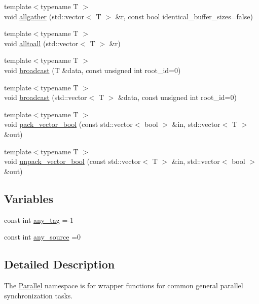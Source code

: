 \begin{DoxyCompactItemize}
\item 
{\footnotesize template$<$typename T $>$ }\\void \mbox{\hyperlink{namespacefemus_1_1_parallel_ae02d87f55017470f374c953e38eaea75}{allgather}} (std\+::vector$<$ T $>$ \&r, const bool identical\+\_\+buffer\+\_\+sizes=false)
\item 
{\footnotesize template$<$typename T $>$ }\\void \mbox{\hyperlink{namespacefemus_1_1_parallel_a879e4a9c2caf698f29d8da1403fece9f}{alltoall}} (std\+::vector$<$ T $>$ \&r)
\item 
{\footnotesize template$<$typename T $>$ }\\void \mbox{\hyperlink{namespacefemus_1_1_parallel_a82b297173b4771c824770ec9acac9689}{broadcast}} (T \&data, const unsigned int root\+\_\+id=0)
\item 
{\footnotesize template$<$typename T $>$ }\\void \mbox{\hyperlink{namespacefemus_1_1_parallel_affafe8ca45b17134d6ee8bbb632aba6b}{broadcast}} (std\+::vector$<$ T $>$ \&data, const unsigned int root\+\_\+id=0)
\item 
{\footnotesize template$<$typename T $>$ }\\void \mbox{\hyperlink{namespacefemus_1_1_parallel_aeda20f4be32ce099559f7e48615b212a}{pack\+\_\+vector\+\_\+bool}} (const std\+::vector$<$ bool $>$ \&in, std\+::vector$<$ T $>$ \&out)
\item 
{\footnotesize template$<$typename T $>$ }\\void \mbox{\hyperlink{namespacefemus_1_1_parallel_a1d9e76823574ef8a7f16c7c6ef63f8be}{unpack\+\_\+vector\+\_\+bool}} (const std\+::vector$<$ T $>$ \&in, std\+::vector$<$ bool $>$ \&out)
\end{DoxyCompactItemize}
\subsection*{Variables}
\begin{DoxyCompactItemize}
\item 
const int \mbox{\hyperlink{namespacefemus_1_1_parallel_a928996065f46cb52e89e132cdcb30328}{any\+\_\+tag}} =-\/1
\item 
const int \mbox{\hyperlink{namespacefemus_1_1_parallel_a7a5a07efca1e4a2f4ef731d4a79703c5}{any\+\_\+source}} =0
\end{DoxyCompactItemize}


\subsection{Detailed Description}
The \mbox{\hyperlink{namespacefemus_1_1_parallel}{Parallel}} namespace is for wrapper functions for common general parallel synchronization tasks.

